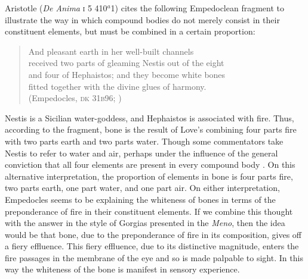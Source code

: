 Aristotle (\emph{De Anima} \textsc{i} 5 410\( ^{a} \)1) cites the following Empedoclean fragment to illustrate the way in which compound bodies do not merely consist in their constituent elements, but must be combined in a certain proportion:
\begin{verse}
    And pleasant earth in her well-built channels\\
    received two parts of gleaming Nestis out of the eight\\
    and four of Hephaistos; and they become white bones\\
    fitted together with the divine glues of harmony.\\
    (Empedocles, \textsc{dk} 31\textsc{b}96; \citealt[62 245]{Inwood:2001ve})
\end{verse}
Nestis is a Sicilian water-goddess, and Hephaistos is associated with fire. Thus, according to the fragment, bone is the result of Love's combining four parts fire with two parts earth and two parts water. Though some commentators take Nestis to refer to water and air, perhaps under the influence of the general conviction that all four elements are present in every compound body \citep[209 n2]{Wright:1981zr}. On this alternative interpretation, the proportion of elements in bone is four parts fire, two parts earth, one part water, and one part air. On either interpretation, Empedocles seems to be explaining the whiteness of bones in terms of the preponderance of fire in their constituent elements. If we combine this thought with the answer in the style of Gorgias presented in the \emph{Meno}, then the idea would be that bone, due to the preponderance of fire in its composition, gives off a fiery effluence. This fiery effluence, due to its distinctive magnitude, enters the fire passages in the membrane of the eye and so is made palpable to sight. In this way the whiteness of the bone is manifest in sensory experience.

